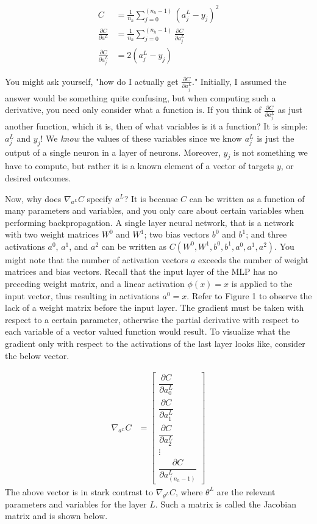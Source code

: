 \documentclass{article}
\begin{document}
\begin{align}
	C                                     & = \frac{1}{n_h} \sum_{j=0}^{(n_h - 1)} { (a_{j}^{L} - y_j)^{2} }                \\
	\frac{\partial C}{\partial a^{L}}     & = \frac{1}{n_h} \sum_{j=0}^{(n_h - 1)} { \frac{\partial C}{\partial a_{j}^{L}}} \\
	\frac{\partial C}{\partial a_{j}^{L}} & = 2(a_{j}^{L} - y_j)
\end{align}

You might ask yourself, "how do I actually get
$\frac{\partial C}{\partial a_{j}^{L}}$." Initially, I assumed the answer would
be something quite confusing, but when computing such a derivative, you need
only consider what a function is. If you think of $\frac{\partial C}{\partial a_{j}^{L}}$
as just another function, which it is, then of what variables is it a function?
It is simple: $a_{j}^{L}$ and $y_j$! We \textit{know} the values of these variables
since we know $a_{j}^{L}$ is just the output of a single neuron in a layer
of neurons. Moreover, $y_j$ is not something we have to compute, but rather it
is a known element of a vector of targets $y$, or desired outcomes.

Now, why does $\nabla_{a^{L}} C$ specify $a^{L}$? It is because $C$ can be written as
a function of many parameters and variables, and you only care about certain variables
when performing backpropagation. A single layer neural network,
that is a network with two weight matrices $W^{0}$ and $W^{1}$; two bias vectors
$b^{0}$ and $b^{1}$; and three activations $a^{0}$, $a^{1}$, and $a^{2}$
can be written as $C(W^{0}, W^{1}, b^{0}, b^{1}, a^{0}, a^{1}, a^{2})$. You might
note that the number of activation vectors $a$ exceeds the number of weight matrices
and bias vectors. Recall that the input layer of the MLP has no preceding
weight matrix, and a linear activation $\phi(x) = x$ is applied to the input vector,
thus resulting in activations $a^{0} = x$. Refer to Figure 1 to observe the lack
of a weight matrix before the input layer. The gradient must be taken with respect to a
certain parameter, otherwise the partial derivative with respect
to each variable of a vector valued function would result. To visualize what the gradient
only with respect to the activations of the last layer looks like, consider the below vector.

\begin{align}
	\nabla_{a^{L}} C & =
	\begin{bmatrix}
		\dfrac{\partial C}{\partial a_{0}^{L}} \\
		\dfrac{\partial C}{\partial a_{1}^{L}} \\
		\dfrac{\partial C}{\partial a_{2}^{L}} \\
		\vdots                                 \\
		\dfrac{\partial C}{\partial a_{(n_{h} - 1)}^{L}}
	\end{bmatrix}
\end{align}
The above vector is in stark contrast to $\nabla_{\theta^{L}} C$, where
$\theta^{L}$ are the relevant parameters and variables for the layer $L$.
Such a matrix is called the Jacobian matrix and is shown below.
\end{document}

